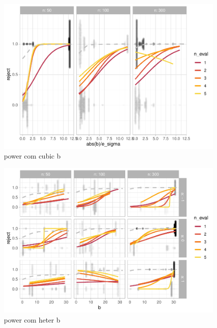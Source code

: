 \documentclass[]{interact}
\theoremstyle{plain}%
\theoremstyle{definition}
\theoremstyle{remark}
\begin{document}
\begin{figure}
\centering
\includegraphics{paper_comparison_files/figure-latex/power-com-cubic-b-1.pdf}
\caption{\label{fig:power-com-cubic-b}power com cubic b}
\end{figure}

\begin{figure}
\centering
\includegraphics{paper_comparison_files/figure-latex/power-com-heter-b-1.pdf}
\caption{\label{fig:power-com-heter-b}power com heter b}
\end{figure}



\end{document}
